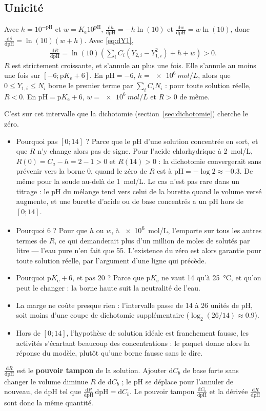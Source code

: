 \documentclass[a4paper,11pt]{article}
\newcommand\logo[1]{\hspace{-12pt}\makebox[12pt][l]{#1}}
\newcommand\rmqphys[1]{\begin{tcolorbox}[rmq, bleu]\logo{\faLightbulb}#1\end{tcolorbox}}
\newcommand\gras[1]{\textbf{#1}}
\newcommand\pH{\ensuremath{\mathrm{pH}}\xspace}
\newcommand\pKe{\ensuremath{\mathrm{p}K_\mathrm{e}}\xspace}
\newcommand\Ke{\ensuremath{K_\mathrm{e}}\xspace}
\newcommand\ddp[2]{\frac{\mathrm{d}#1}{\mathrm{d}#2}}
\newcommand\pare[1]{\left(#1\right)}
\begin{document}
\subsection{Unicité}
Avec $h=10^{-\pH}$ et $w=\Ke10^{\pH}$, $\ddp h\pH=-h\ln(10)$ et $\ddp w\pH=w\ln(10)$, donc $\ddp\delta\pH=\ln(10)\pare{w+h}$.
Avec \eqref{eq:dY1},
\begin{align}
\ddp R\pH=\ln(10)\pare{\sum_iC_i\pare{Y_{2,i}-Y_{1,i}^2}+h+w}>0.
\label{eq:dR}
\end{align}
$R$ est strictement croissante, et s'annule au plus une fois.
Elle s'annule au moins une fois sur $[-6;\pKe+6]$.
En $\pH=-6$, $h=\qty{e6}{mol/L}$, alors que $0\le Y_{1,i}\le N_i$ borne le premier terme par $\sum_iC_iN_i$ : pour toute solution réelle, $R<0$.
En $\pH=\pKe+6$, $w=\qty{e6}{mol/L}$ et $R>0$ de même.
\begin{algo}
C'est sur cet intervalle que la dichotomie (section~\ref{sec:dichotomie}) cherche le zéro.
\begin{itemize}
\item Pourquoi pas $[0;14]$ ? Parce que le \pH d'une solution concentrée en sort, et que $R$ n'y change alors pas de signe.
Pour l'acide chlorhydrique à \qty{2}{mol/L}, $R(0)=C_a-h=2-1>0$ et $R(14)>0$ : la dichotomie convergerait sans prévenir vers la borne 0, quand le zéro de $R$ est à $\pH=-\log2\approx\num{-0,3}$.
De même pour la soude au-delà de \qty{1}{mol/L}.
Le cas n'est pas rare dans un titrage : le \pH du mélange tend vers celui de la burette quand le volume versé augmente, et une burette d'acide ou de base concentrés a un \pH hors de $[0;14]$.
\item Pourquoi 6 ? Pour que $h$ ou $w$, à \qty{e6}{mol/L}, l'emporte sur tous les autres termes de $R$, ce qui demanderait plus d'un million de moles de solutés par litre — l'eau pure n'en fait que 55.
L'existence du zéro est alors garantie pour toute solution réelle, par l'argument d'une ligne qui précède.
\item Pourquoi $\pKe+6$, et pas 20 ? Parce que \pKe ne vaut 14 qu'à \qty{25}{\degreeCelsius}, et qu'on peut le changer : la borne haute suit la neutralité de l'eau.
\item La marge ne coûte presque rien : l'intervalle passe de 14 à 26 unités de \pH, soit moins d'une coupe de dichotomie supplémentaire ($\log_2(26/14)\approx\num{0,9}$).
\item Hors de $[0;14]$, l'hypothèse de solution idéale est franchement fausse, les activités s'écartant beaucoup des concentrations : le paquet donne alors la réponse du modèle, plutôt qu'une borne fausse sans le dire.
\end{itemize}
\end{algo}
\rmqphys{$\ddp R\pH$ est le \gras{pouvoir tampon} de la solution.
Ajouter $\mathrm dC_b$ de base forte sans changer le volume diminue $R$ de $\mathrm dC_b$ ; le \pH se déplace pour l'annuler de nouveau, de $\mathrm d\pH$ tel que $\ddp R\pH\,\mathrm d\pH=\mathrm dC_b$.
Le pouvoir tampon $\ddp{C_b}\pH$ et la dérivée $\ddp R\pH$ sont donc la même quantité.}
\end{document}
